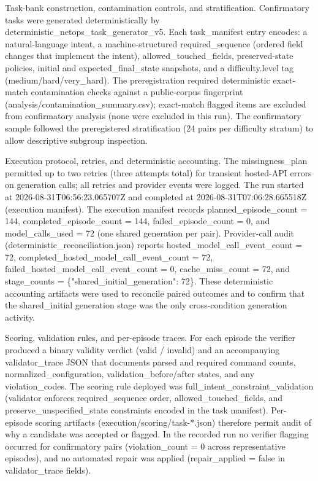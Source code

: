 \documentclass[conference]{IEEEtran}
\begin{document}
Task-bank construction, contamination controls, and stratification. Confirmatory tasks were generated deterministically by deterministic\_netops\_task\_generator\_v5. Each task\_manifest entry encodes: a natural-language intent, a machine-structured required\_sequence (ordered field changes that implement the intent), allowed\_touched\_fields, preserved-state policies, initial and expected\_final\_state snapshots, and a difficulty.level tag (medium/hard/very\_hard). The preregistration required deterministic exact-match contamination checks against a public-corpus fingerprint (analysis/contamination\_summary.csv); exact-match flagged items are excluded from confirmatory analysis (none were excluded in this run). The confirmatory sample followed the preregistered stratification (24 pairs per difficulty stratum) to allow descriptive subgroup inspection.

Execution protocol, retries, and deterministic accounting. The missingness\_plan permitted up to two retries (three attempts total) for transient hosted-API errors on generation calls; all retries and provider events were logged. The run started at 2026-08-31T06:56:23.065707Z and completed at 2026-08-31T07:06:28.665518Z (execution manifest). The execution manifest records planned\_episode\_count = 144, completed\_episode\_count = 144, failed\_episode\_count = 0, and model\_calls\_used = 72 (one shared generation per pair). Provider-call audit (deterministic\_reconciliation.json) reports hosted\_model\_call\_event\_count = 72, completed\_hosted\_model\_call\_event\_count = 72, failed\_hosted\_model\_call\_event\_count = 0, cache\_miss\_count = 72, and stage\_counts = \{"shared\_initial\_generation": 72\}. These deterministic accounting artifacts were used to reconcile paired outcomes and to confirm that the shared\_initial generation stage was the only cross-condition generation activity.

Scoring, validation rules, and per-episode traces. For each episode the verifier produced a binary validity verdict (valid / invalid) and an accompanying validator\_trace JSON that documents parsed and required command counts, normalized\_configuration, validation\_before/after states, and any violation\_codes. The scoring rule deployed was full\_intent\_constraint\_validation (validator enforces required\_sequence order, allowed\_touched\_fields, and preserve\_unspecified\_state constraints encoded in the task manifest). Per-episode scoring artifacts (execution/scoring/task-*.json) therefore permit audit of why a candidate was accepted or flagged. In the recorded run no verifier flagging occurred for confirmatory pairs (violation\_count = 0 across representative episodes), and no automated repair was applied (repair\_applied = false in validator\_trace fields).
\end{document}
